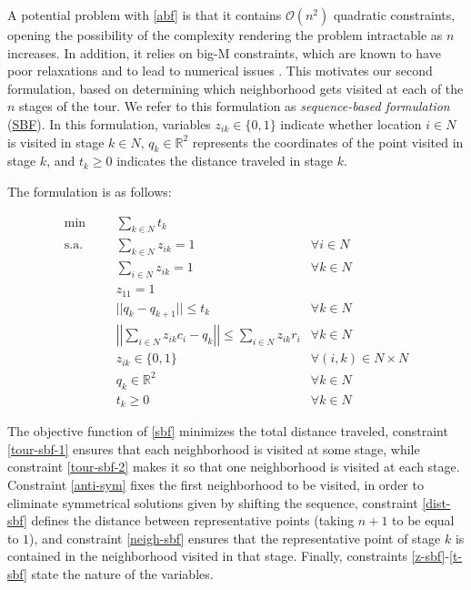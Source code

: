 \documentclass[pdflatex,sn-mathphys-num]{sn-jnl}%
\begin{document}
A potential problem with \ref{abf} is that it contains $\mathcal{O}(n^2)$ quadratic constraints, opening the possibility of the complexity rendering the problem intractable as $n$ increases. In addition, it relies on big-M constraints, which are known to have poor relaxations and to lead to numerical issues \cite{article:bigM}. This motivates our second formulation, based on determining which neighborhood gets visited at each of the $n$ stages of the tour. We refer to this formulation as \textit{sequence-based formulation} (\hyperref[sbf]{SBF}). In this formulation, variables $z_{ik} \in \{0,1\}$ indicate whether location $i \in N$ is visited in stage $k \in N$, $q_k \in \mathbb{R}^2$ represents the coordinates of the point visited in stage $k$, and $t_k \geq 0$ indicates the distance traveled in stage $k$.

The formulation is as follows:

\begin{subequations}
\begin{align}
\min &&& \sum_{k \in N} t_k \tag{SBF} \label{sbf}\\
\text{s.a.} &&& \sum_{k \in N} z_{ik} = 1 &\forall i \in N \label{tour-sbf-1}\\
&&& \sum_{i \in N} z_{ik} = 1 &\forall k \in N \label{tour-sbf-2}\\
&&& z_{11} = 1 \label{anti-sym}\\
&&& ||q_k - q_{k+1}|| \leq t_k &\forall k \in N \label{dist-sbf}\\
&&& \left|\left|\sum_{i \in N} {z}_{ik}  c_i - q_k\right|\right| \leq \sum_{i\in N} {z}_{ik}  r_i &\forall k \in N \label{neigh-sbf}\\
&&& z_{ik} \in \{0,1\} &\forall (i,k) \in N\times N \label{z-sbf}\\
&&& q_{k} \in \mathbb{R}^2 &\forall k \in N \label{q-sbf}\\
&&& t_{k} \geq 0 & \forall k \in N \label{t-sbf}
\end{align}
\end{subequations}

 The objective function of \ref{sbf} minimizes the total distance traveled, constraint \eqref{tour-sbf-1} ensures that each neighborhood is visited at some stage, while constraint \eqref{tour-sbf-2} makes it so that one neighborhood is visited at each stage. Constraint \eqref{anti-sym} fixes the first neighborhood to be visited, in order to eliminate symmetrical solutions given by shifting the sequence, constraint \eqref{dist-sbf} defines the distance between representative points (taking $n+1$ to be equal to $1$), and constraint \eqref{neigh-sbf} ensures that the representative point of stage $k$ is contained in the neighborhood visited in that stage. Finally, constraints \eqref{z-sbf}-\eqref{t-sbf} state the nature of the variables.
\end{document}
